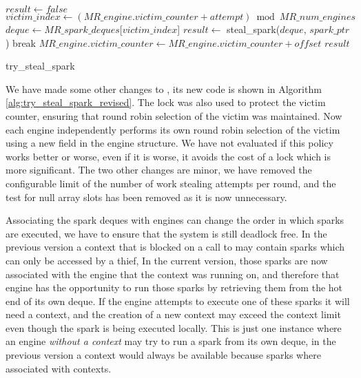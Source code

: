 \begin{algorithm}[tbp]
\begin{algorithmic}[1]
  \State $result \gets false$
    \State $victim\_index \gets
        (MR\_engine.victim\_counter + attempt) \bmod MR\_num\_engines$
    \State $deque \gets
       MR\_spark\_deques$[$victim\_index$]
    \State $result \gets$ steal\_spark($deque$, $spark\_ptr$)
      \State break
    \EndIf
  \EndFor
  \State $MR\_engine.victim\_counter \gets
    MR\_engine.victim\_counter + offset$
  \State \Return $result$
\EndProcedure
\end{algorithmic}
\caption{try\_steal\_spark}
\label{alg:try_steal_spark_revised}
\end{algorithm}

We have made some other changes to \trystealspark,
its new code is shown in Algorithm \ref{alg:try_steal_spark_revised}.
The lock was also used to protect the victim counter,
ensuring that round robin selection of the victim was maintained.
Now each engine independently performs its own round robin selection of the
victim using a new field  in the engine structure.
We have not evaluated if this policy works better or worse,
even if it is worse,
it avoids the cost of a lock which is more significant.
The two other changes are minor,
we have removed the configurable limit of the number of work stealing
attempts per round,
and the test for null array slots has been removed as it is now unnecessary.

Associating the spark deques with engines can change the order in which
sparks are executed,
we have to ensure that the system is still deadlock free.
In the previous version
a context that is blocked on a call to \wait may contain sparks
which can only be accessed by a thief,
In the current version,
those sparks are now associated with the engine that the context was running
on,
and therefore that engine has the opportunity to run those sparks by
retrieving them from the hot end of its own deque.
If the engine attempts to execute one of these sparks it will need a
context,
and the creation of a new context may exceed the context limit even though
the spark is being executed locally.
This is just one instance where an engine \emph{without a context}
may try to run a spark from its own deque,
in the previous version a context would always be available because sparks
where associated with contexts.

